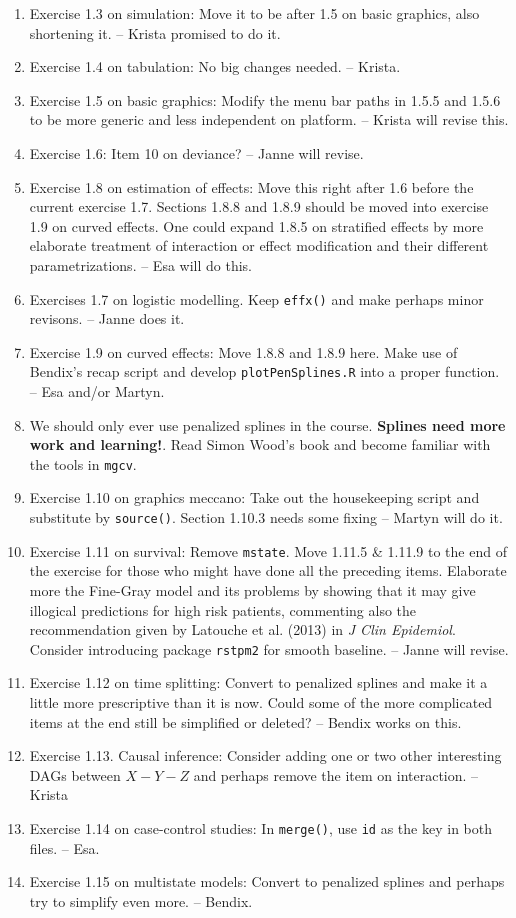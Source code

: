 \begin{enumerate}
\item Exercise 1.3 on simulation: Move it to be after 1.5 on basic graphics, also shortening
it. -- Krista promised to do it.
\item Exercise 1.4 on tabulation: No big changes needed. -- Krista.
\item Exercise 1.5 on basic graphics: Modify  the menu bar paths in 1.5.5 and 1.5.6
to be more generic and less independent on platform. -- Krista will revise this. 
\item Exercise 1.6: Item 10 on deviance? -- Janne will revise.
\item Exercise 1.8 on estimation of effects: Move this right after 1.6 before the current 
exercise 1.7. Sections 1.8.8 and 1.8.9 should be moved into exercise 1.9 on curved effects.
One could expand 1.8.5 on stratified effects by more elaborate treatment
of interaction or effect modification and their different parametrizations.
-- Esa will do this.
\item Exercises 1.7 on logistic modelling. Keep \texttt{effx()} and make perhaps minor revisons.
-- Janne does it.
\item Exercise 1.9 on curved effects: Move 1.8.8 and 1.8.9 here.
Make use of Bendix's recap script and develop \texttt{plotPenSplines.R}
into a proper function. -- Esa and/or Martyn.
\item We should only ever use penalized splines in the course.
	\textbf{Splines need more work and learning!}. Read Simon Wood's book and
  become familiar with the tools in \texttt{mgcv}.
\item Exercise 1.10 on graphics meccano: Take out the housekeeping script and substitute by
\texttt{source()}. Section 1.10.3 needs some fixing -- Martyn will do it.
\item Exercise 1.11 on survival: Remove \texttt{mstate}. Move 1.11.5 \& 1.11.9 to the end  of the
exercise for those who might have done all the preceding items. Elaborate more 
the Fine-Gray model and its problems by  showing that it may give illogical predictions for high risk patients, commenting also
the recommendation given by Latouche et al. (2013) in \textit{J Clin Epidemiol}.
Consider introducing package \texttt{rstpm2} for smooth baseline. -- Janne will revise.
\item Exercise 1.12 on time splitting: Convert to penalized splines and  
make it a little more prescriptive than it is now. Could some of the
more complicated items at the end still be simplified or deleted? 
-- Bendix works on this.
\item Exercise 1.13. Causal inference: Consider adding one or two other
 interesting DAGs between $X-Y-Z$
and perhaps remove the item on interaction. -- Krista
\item Exercise 1.14 on case-control studies: In \texttt{merge()}, use \texttt{id}
as the key in both files. -- Esa.
\item Exercise 1.15 on multistate models: Convert to penalized splines and perhaps
try to simplify even more. --  Bendix.  
\end{enumerate}

